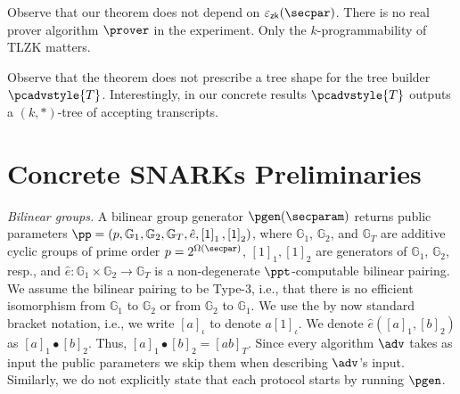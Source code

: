 \documentclass[10pt]{llncs}
\let\spvec\vec
\let\vec\accentvec
\let\spvec\vec
\let\vec\spvec
\def\vec#1{\mathchoice{\mbox{\boldmath$\displaystyle#1$}}
  {\mbox{\boldmath$\textstyle#1$}} {\mbox{\boldmath$\scriptstyle#1$}}
  {\mbox{\boldmath$\scriptscriptstyle#1$}}}
\newcommand{\pcvarstyle}[1]{\mathsf{#1}}
\newcommand{\GRP} {\mathbb{G}}
\newcommand{\pair} {\hat{e}}
\newcommand{\eps}{\varepsilon}
\newcommand{\bmap}[2] {\left[#1\right]_{#2}}
\newcommand{\gone}[1] {\bmap{#1}{1}}
\newcommand{\gtwo}[1] {\bmap{#1}{2}}
\newcommand{\gi} {\iota}
\newcommand{\gtar}[1] {\bmap{#1}{T}}
\newcommand{\grpgi}[1] {\bmap{#1}{\gi}}
\newcommand{\tdv}{\pcadvstyle{T}}
\newcommand{\epszk}{\eps_{\pcvarstyle{zk}}}
\DeclareRobustCommand{\markulf}[2] {}%
\DeclareRobustCommand{\michals}[2] {} %
\newcommand{\hamid}[2] {} %
\newcommand{\ourpar}[1] {\smallskip\noindent\emph{#1}}
\begin{document}
\begin{remark}
	Observe that our theorem does not depend on $\epszk(\secpar)$. There is no real prover algorithm $\prover$ in the experiment. Only the $k$-programmability of TLZK matters. 
\end{remark}

\begin{remark}
	Observe that the theorem does not prescribe a tree shape for the tree builder $\tdv$. Interestingly, in our concrete results $\tdv$ outputs a $(k, *)$-tree of accepting transcripts.
\end{remark}



%




\section{Concrete SNARKs Preliminaries}

\ourpar{Bilinear groups.}
A bilinear group generator $\pgen (\secparam)$ returns public parameters $ \pp =
(p, \GRP_1, \GRP_2, \GRP_T, \pair, \gone{1}, \gtwo{1})$, where $\GRP_1$,
$\GRP_2$, and $\GRP_T$ are additive cyclic groups of prime order $p = 2^{\Omega
	(\secpar)}$, $\gone{1}, \gtwo{1}$ are generators of $\GRP_1$, $\GRP_2$, resp.,
and $\pair: \GRP_1 \times \GRP_2 \to \GRP_T$ is a non-degenerate
$\ppt$-computable bilinear pairing. We assume the bilinear pairing to be Type-3,
i.e., that there is no efficient isomorphism from $\GRP_1$ to $\GRP_2$ or from
$\GRP_2$ to $\GRP_1$. We use the by now standard bracket notation, i.e., we
write $\bmap{a}{\gi}$ to denote $a \bmap{1}{\gi}$. %
We denote $\pair (\gone{a}, \gtwo{b})$ as $\gone{a} \bullet
\gtwo{b}$. Thus, $\gone{a} \bullet \gtwo{b} = \gtar{a b}$. 
Since every algorithm $\adv$ takes as input
the public parameters we skip them when describing $\adv$'s input. Similarly, we
do not explicitly state that each protocol starts by running $\pgen$.
\end{document}
